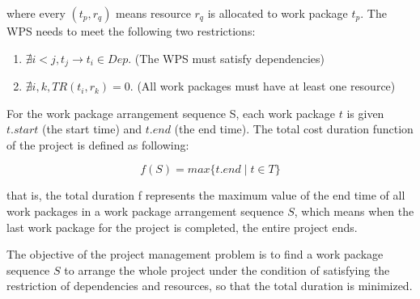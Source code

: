 where every $(t_p, r_q)$ means resource $r_q$ is allocated to work package $t_p$.
The WPS needs to meet the following two restrictions:

\begin{enumerate}
\item $\nexists i < j, t_j \rightarrow t_i \in Dep$.
  (The WPS must satisfy dependencies)
\item $\nexists i, k, TR(t_i, r_k) = 0$.
  (All work packages must have at least one resource)
\end{enumerate}

For the work package arrangement sequence S, each work package $t$ is
given $t.start$ (the start time) and $t.end$ (the end time).  The
total cost duration function of the project is defined as following:

\begin{equation}
f(S) = max\{t.end \mid t \in T\}
\end{equation}

that is, the total duration f represents the maximum value of the end
time of all work packages in a work package arrangement sequence $S$,
which means when the last work package for the project is completed,
the entire project ends.

The objective of the project management problem is to find a work
package sequence $S$ to arrange the whole project under the condition
of satisfying the restriction of dependencies and resources, so that
the total duration is minimized.

